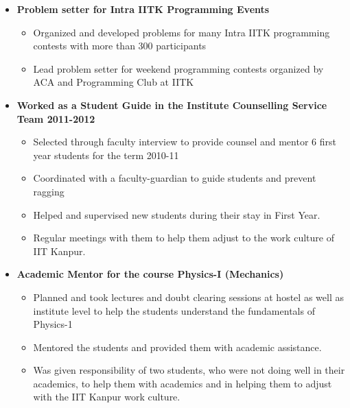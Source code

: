 \documentclass[margin,line]{resume}
\begin{document}
\begin{resume}
\begin{itemize}
  \item \textbf{\textsf{Problem setter for Intra IITK Programming Events}}
    \begin{itemize}
    \item Organized and developed problems for many Intra IITK programming contests with more than 300 participants
    \item Lead problem setter for weekend programming contests organized by ACA and Programming Club at IITK
    \end{itemize}

  \item \textbf{\textsf Worked as a Student Guide in the Institute Counselling Service Team 2011-2012}
    \begin{itemize}
    \item Selected through faculty interview to provide counsel and mentor 6 first year students for the term 2010-11
    \item Coordinated with a faculty-guardian to guide students and prevent ragging
    \item Helped and supervised new students during their stay in First Year.
    \item Regular meetings with them to help them adjust to the work culture of IIT Kanpur.
    \end{itemize}

  \item \textbf{\textsf Academic Mentor for the course Physics-I (Mechanics)}
    \begin{itemize}
    \item Planned and took lectures and doubt clearing sessions at hostel as well as institute level to help the students understand the fundamentals of Physics-1
    \item Mentored the students and provided them with academic assistance.
    \item Was given responsibility of two students, who were not doing well in their academics, to help them with academics and in helping them to adjust with the IIT Kanpur work culture.
    \end{itemize}
    


\end{itemize}
\end{resume}
\end{document}
